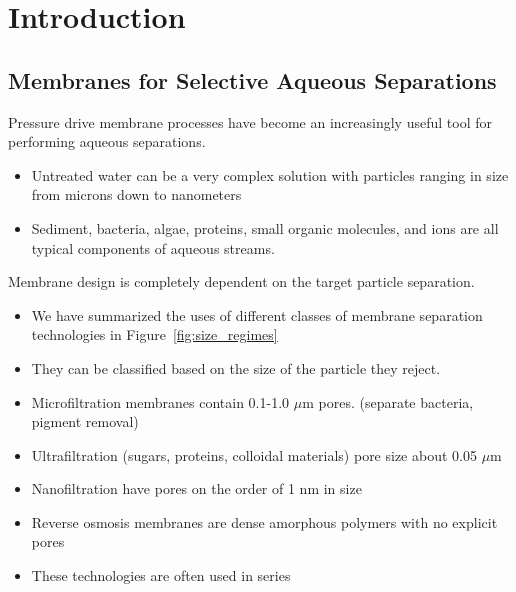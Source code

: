\chapter{Introduction}\label{chapter:intro}

  \section{Membranes for Selective Aqueous Separations}
  
  Pressure drive membrane processes have become an increasingly useful tool for
  performing aqueous separations.
  \begin{itemize}
    \item Untreated water can be a very complex solution with particles ranging
    in size from microns down to nanometers
    \item Sediment, bacteria, algae, proteins, small organic molecules, and ions
    are all typical components of aqueous streams.
  \end{itemize}
  
  Membrane design is completely dependent on the target particle separation. 
  \begin{itemize}
    \item We have summarized the uses of different classes of membrane separation 
    technologies in Figure~\ref{fig:size_regimes}
    \item They can be classified based on the size of the particle they reject.
    \item Microfiltration membranes contain 0.1-1.0 $\mu$m pores. (separate bacteria, pigment removal)
    \item Ultrafiltration (sugars, proteins, colloidal materials) pore size about 0.05 $\mu$m
    \item Nanofiltration have pores on the order of 1 nm in size
    \item Reverse osmosis membranes are dense amorphous polymers with no explicit pores
    \item These technologies are often used in series
  \end{itemize}
  
